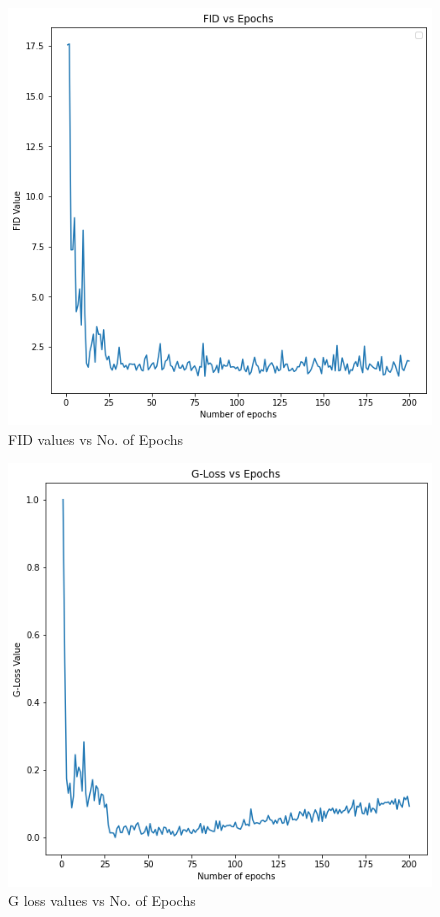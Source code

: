 \documentclass{article}
\begin{document}
\begin{figure}[H]
    \centering
    \includegraphics[width=\textwidth]{FID.png}
    \caption{FID values vs No. of Epochs}
    \label{fig:compute}
\end{figure}

\begin{figure}[H]
    \centering
    \includegraphics[width=\textwidth]{G_Loss.png}
    \caption{G loss values vs No. of Epochs}
    \label{fig:compute}
\end{figure}
\end{document}
